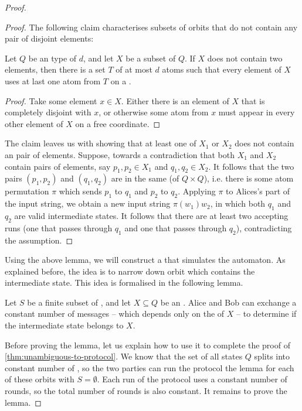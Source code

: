 \begin{proof}
\begin{proof}
The following claim characterises subsets of orbits that do not contain any pair of disjoint elements:
\begin{claim}\label{claim:sunflower}
  Let $Q$ be an  type of  $d$, and let $X$ be a subset of $Q$.
  If $X$ does not contain two  elements, then there is a
  set $T$ of at most $d$ atoms such that every element of $X$ uses at last one atom from $T$ on a .
\end{claim}
\begin{proof}
        Take some element $x \in X$. Either there is an element of $X$ that is completely disjoint with $x$, or otherwise some atom from $x$ must appear in every other element of $X$ on a free coordinate.
\end{proof}

The claim leaves us with showing that at least one of $X_1$ or $X_2$ does not
contain an  pair of elements. Suppose, towards a contradiction that
both $X_1$ and $X_2$ contain  pairs of elements, say $p_1, p_2 \in
X_1$ and $q_1, q_2 \in X_2$. It follows that the two pairs $(p_1,p_2)$ and
$(q_1,q_2)$ are in the same  (of $Q \times Q$), i.e. there is
some atom permutation $\pi$ which sends $p_1$ to $q_1$ and $p_2$ to $q_2$.
Applying $\pi$ to Alices's part of the input string, we obtain a new input
string $\pi(w_1) w_2$, in which both $q_1$ and $q_2$ are valid intermediate
states. It follows that there are at least two accepting runs (one that passes
through $q_1$ and one that passes through $q_2$), contradicting the 
assumption. 
\end{proof}

Using the above lemma, we will construct a  that
simulates the automaton. As explained before, the idea is to narrow down orbit
which contains the intermediate state. This idea is formalised in the following
lemma. 


\begin{lemma}\label{lem:narrow-down-orbit}
  Let $S$ be a finite subset of , and let $X \subseteq Q$ be an . 
  Alice and Bob can exchange a constant number of messages
  -- which depends only on the  of $X$ -- 
  to determine if the intermediate state belongs to $X$. 
\end{lemma}

Before proving the lemma, let us explain how to use it to complete the proof of
\cref{thm:unambiguous-to-protocol}. We know that the set of all states $Q$
splits into constant number of , so the two parties can run
the protocol the lemma for each of these orbits with $S=\emptyset$. Each run of
the protocol uses a constant number of rounds, so the total number of rounds is
also constant. It remains to prove the lemma.


\end{proof}
